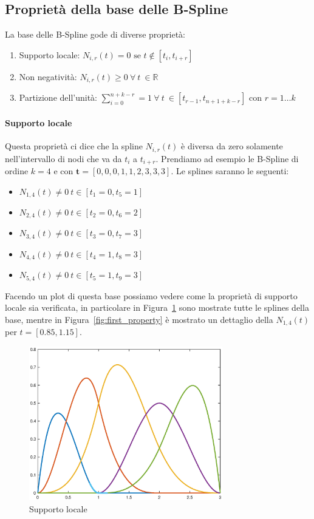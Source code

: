 \documentclass[a4paper, 10pt]{article}
\begin{document}
\subsection{Proprietà della base delle B-Spline}
La base delle B-Spline gode di diverse proprietà:
\begin{enumerate}
  \item Supporto locale: $N_{i, r}(t) = 0 \text{ se } t \notin [t_i, t_{i+r}]$
  \item Non negatività: $N_{i, r}(t) \geq 0\ \forall \ t \ \in \mathbb{R}$
  \item Partizione dell'unità: $\sum_{i = 0}^{n+k-r} = 1 \ \forall \  t \ \in [t_{r-1}, t_{n+1+k-r}] \text{ con } r = 1 \dots k$
\end{enumerate}
\paragraph{Supporto locale}
Questa proprietà ci dice che la spline $N_{i, r}(t)$ è diversa da zero solamente nell'intervallo di nodi che va 
da $t_i$ a $t_{i+r}$. Prendiamo ad esempio le B-Spline di ordine $k = 4$ e 
con $\mathbf{t} = [0, 0, 0, 1, 1, 2, 3, 3, 3]$. Le splines saranno le seguenti:
\begin{itemize}
  \item $N_{1, 4}(t)\neq 0\ t \in [t_1 = 0, t_5 = 1]$
  \item $N_{2, 4}(t)\neq 0\ t \in [t_2 = 0, t_6 = 2]$
  \item $N_{3, 4}(t)\neq 0\ t \in [t_3 = 0, t_7 = 3]$
  \item $N_{4, 4}(t)\neq 0\ t \in [t_4 = 1, t_8 = 3]$
  \item $N_{5, 4}(t)\neq 0\ t \in [t_5 = 1, t_9 = 3]$
\end{itemize}
Facendo un plot di questa base possiamo vedere come la proprietà di supporto locale sia verificata, in particolare in Figura~\ref{fig:local_support} sono mostrate
tutte le splines della base, mentre in Figura~\ref{fig:first_property} è mostrato un dettaglio della $N_{1, 4}(t)$ per $t = [0.85, 1.15]$.
\begin{figure}[h]
  \centering
  \includegraphics[width=0.75\textwidth]{figure/local_support.eps}
  \caption{Supporto locale}
  \label{fig:local_support}
\end{figure} 
\end{document}

